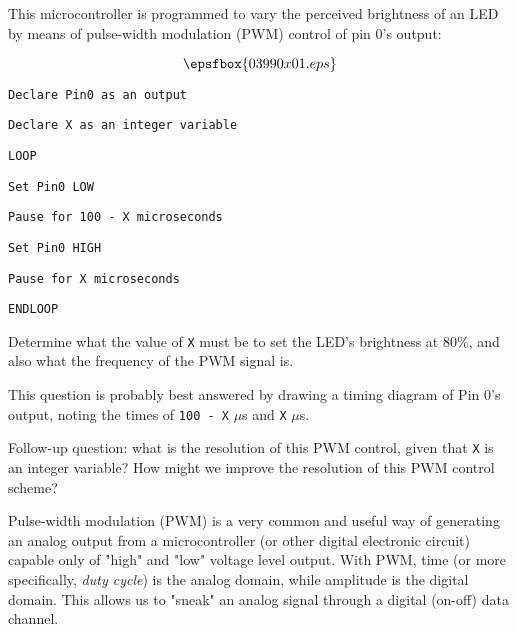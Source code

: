 

This microcontroller is programmed to vary the perceived brightness of an LED by means of pulse-width modulation (PWM) control of pin 0's output:

$$\epsfbox{03990x01.eps}$$

\noindent
{}

{\tt Declare Pin0 as an output}

{\tt Declare X as an integer variable}

{\tt LOOP}

\hskip 10pt {\tt Set Pin0 LOW}

\hskip 10pt {\tt Pause for 100 - X microseconds}

\hskip 10pt {\tt Set Pin0 HIGH}

\hskip 10pt {\tt Pause for X microseconds}

{\tt ENDLOOP}

\vskip 10pt

Determine what the value of {\tt X} must be to set the LED's brightness at 80\%, and also what the frequency of the PWM signal is.







This question is probably best answered by drawing a timing diagram of Pin 0's output, noting the times of {\tt 100 - X} $\mu$s and {\tt X} $\mu$s.

\vskip 10pt

Follow-up question: what is the resolution of this PWM control, given that {\tt X} is an integer variable?  How might we improve the resolution of this PWM control scheme?







Pulse-width modulation (PWM) is a very common and useful way of generating an analog output from a microcontroller (or other digital electronic circuit) capable only of "high" and "low" voltage level output.  With PWM, time (or more specifically, {\it duty cycle}) is the analog domain, while amplitude is the digital domain.  This allows us to "sneak" an analog signal through a digital (on-off) data channel.

